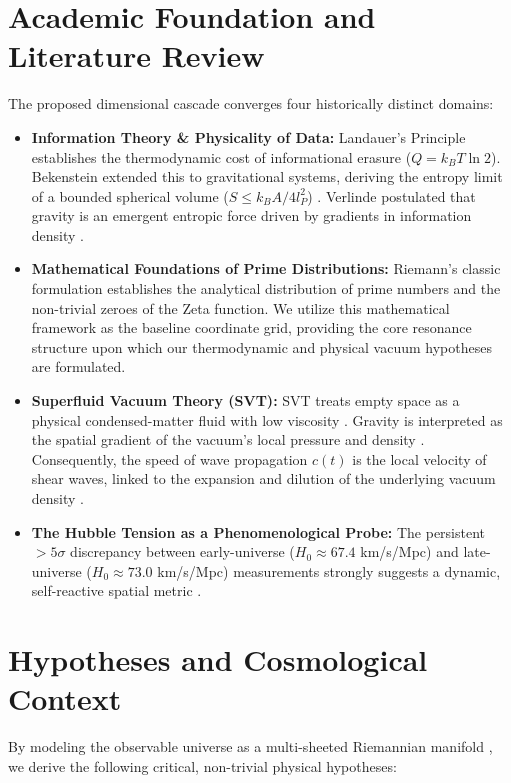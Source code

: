 \documentclass[twocolumn]{aa}
\begin{document}
\section{Academic Foundation and Literature Review}
The proposed dimensional cascade converges four historically distinct domains:
\begin{itemize}
    \item \textbf{Information Theory \& Physicality of Data:} Landauer's Principle \cite{landauer1961} establishes the thermodynamic cost of informational erasure ($Q=k_B T \ln 2$). Bekenstein \cite{bekenstein1981} extended this to gravitational systems, deriving the entropy limit of a bounded spherical volume ($S \le k_B A / 4l_P^2$) \cite{bekenstein1981}. Verlinde \cite{verlinde2011} postulated that gravity is an emergent entropic force driven by gradients in information density \cite{verlinde2011}.
    \item \textbf{Mathematical Foundations of Prime Distributions:} Riemann's classic formulation \cite{riemann1857} establishes the analytical distribution of prime numbers and the non-trivial zeroes of the Zeta function. We utilize this mathematical framework as the baseline coordinate grid, providing the core resonance structure upon which our thermodynamic and physical vacuum hypotheses are formulated.
    \item \textbf{Superfluid Vacuum Theory (SVT):} SVT treats empty space as a physical condensed-matter fluid with low viscosity \cite{volovik2003}. Gravity is interpreted as the spatial gradient of the vacuum's local pressure and density \cite{volovik2003}. Consequently, the speed of wave propagation $c(t)$ is the local velocity of shear waves, linked to the expansion and dilution of the underlying vacuum density \cite{volovik2003}.
    \item \textbf{The Hubble Tension as a Phenomenological Probe:} The persistent $>5\sigma$ discrepancy between early-universe ($H_0 \approx 67.4$ km/s/Mpc) \cite{planck2020} and late-universe ($H_0 \approx 73.0$ km/s/Mpc) \cite{riess2021} measurements strongly suggests a dynamic, self-reactive spatial metric \cite{riess2021}.
\end{itemize}

\section{Hypotheses and Cosmological Context}
By modeling the observable universe as a multi-sheeted Riemannian manifold \cite{riemann1857}, we derive the following critical, non-trivial physical hypotheses:
\end{document}
